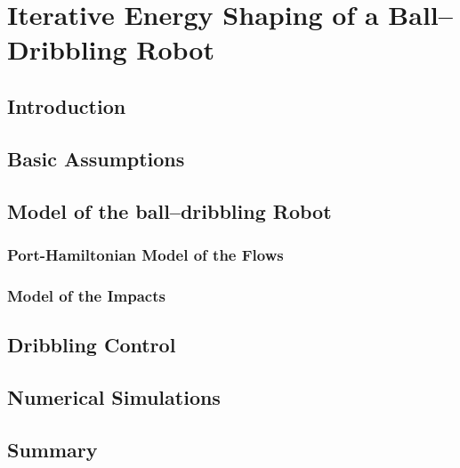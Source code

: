 
\chapter{Iterative Energy Shaping of a Ball--Dribbling Robot}

\label{chap:multistable}
\minitoc

\thispagestyle{empty}

\newpage
\section{Introduction}
%

\section{Basic Assumptions}
%
\section{Model of the ball--dribbling Robot}\label{sec:DBR}
\subsection{Port-Hamiltonian Model of the Flows}
\subsection{Model of the Impacts}

\section{Dribbling Control}\label{sec:control}

\section{Numerical Simulations}

\section{Summary}
